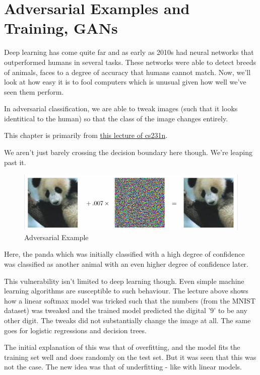 \chapter{Adversarial Examples and Training, GANs}

Deep learning has come quite far and as early as 2010s had neural networks that outperformed humans in several tasks. These networks were able to detect breeds of animals, faces to a degree of accuracy that humans cannot match. Now, we'll look at how easy it is to fool computers which is unusual given how well we've seen them perform. 

In adversarial classification, we are able to tweak images (such that it looks identitical to the human) so that the class of the image changes entirely.

This chapter is primarily from \href{https://www.youtube.com/watch?v=CIfsB_EYsVI}{this lecture of cs231n}. 

We aren't just barely crossing the decision boundary here though. We're leaping past it. 

\begin{figure}[h]
    \centering
    \includegraphics[width=12cm]{img/panda-adversary.png}
    \caption{Adversarial Example}
    \label{fig:panda}
\end{figure}

Here, the panda which was initially classified with a high degree of confidence was classified as another animal with an even higher degree of confidence later.

This vulnerability isn't limited to deep learning though. Even simple machine learning algorithms are susceptible to such behaviour. The lecture above shows how a linear softmax model was tricked such that the numbers (from the MNIST dataset) was tweaked and the trained model predicted the digital '9' to be any other digit. The tweaks did not substantially change the image at all. The same goes for logistic regressions and decision trees.

The initial explanation of this was that of overfitting, and the model fits the training set well and does randomly on the test set. But it was seen that this was not the case. The new idea was that of underfitting - like with linear models.

